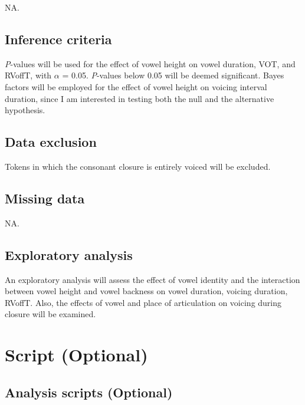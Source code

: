 \documentclass[11pt,]{article}
\begin{document}
NA.

\hypertarget{inference-criteria}{%
\subsection{Inference criteria}\label{inference-criteria}}

\emph{P}-values will be used for the effect of vowel height on vowel
duration, VOT, and RVoffT, with \(\alpha\) = 0.05. \emph{P}-values below
0.05 will be deemed significant. Bayes factors will be employed for the
effect of vowel height on voicing interval duration, since I am
interested in testing both the null and the alternative hypothesis.

\hypertarget{data-exclusion}{%
\subsection{Data exclusion}\label{data-exclusion}}

Tokens in which the consonant closure is entirely voiced will be
excluded.

\hypertarget{missing-data}{%
\subsection{Missing data}\label{missing-data}}

NA.

\hypertarget{exploratory-analysis}{%
\subsection{Exploratory analysis}\label{exploratory-analysis}}

An exploratory analysis will assess the effect of vowel identity and the
interaction between vowel height and vowel backness on vowel duration,
voicing duration, RVoffT. Also, the effects of vowel and place of
articulation on voicing during closure will be examined.

\hypertarget{script-optional}{%
\section{Script (Optional)}\label{script-optional}}

\hypertarget{analysis-scripts-optional}{%
\subsection{Analysis scripts
(Optional)}\label{analysis-scripts-optional}}
\end{document}
